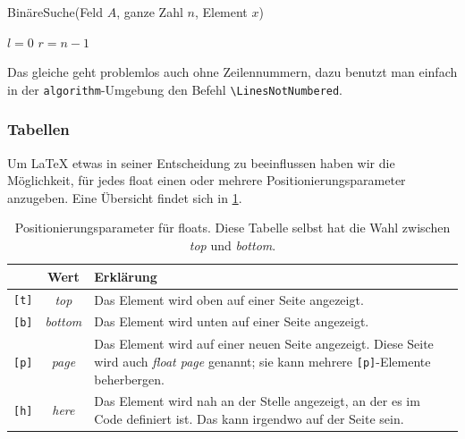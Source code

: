 \documentclass[bachelor,german]{algothesis}
\begin{document}
\begin{algorithm}[t]
  \caption{BinäreSuche(Feld $A$, ganze Zahl $n$, Element $x$)}
  \label{alg:binsearch}
  
  $l = 0$ \;
  $r = n-1$ \;
  
  \Return \False
\end{algorithm}

Das gleiche geht problemlos auch ohne Zeilennummern, dazu benutzt man einfach in der \verb+algorithm+-Umgebung den Befehl \verb+\LinesNotNumbered+.

\subsubsection{Tabellen}

Um \LaTeX{} etwas in seiner Entscheidung zu beeinflussen haben wir die Möglichkeit, für jedes float einen oder mehrere Positionierungsparameter anzugeben.
Eine Übersicht findet sich in \cref{tab:floatparameters}.

\begin{table}[tb]
 \caption{Positionierungsparameter für floats. Diese Tabelle selbst hat die Wahl zwischen \emph{top} und \emph{bottom}.}
 \label{tab:floatparameters}
 \centering
 \begin{tabularx}{0.9\textwidth}{p{1cm}cX}
  & Wert & Erklärung\\
 \hline
  \texttt{[t]}  & \emph{top} & Das Element wird oben auf einer Seite angezeigt. \\
  \texttt{[b]}  & \emph{bottom} & Das Element wird unten auf einer Seite angezeigt. \\
  \texttt{[p]}  & \emph{page} & Das Element wird auf einer neuen Seite angezeigt. Diese Seite wird auch \emph{float page} genannt; sie kann mehrere \texttt{[p]}-Elemente beherbergen. \\
  \texttt{[h]}  & \emph{here} & Das Element wird nah an der Stelle angezeigt, an der es im Code definiert ist. Das kann irgendwo auf der Seite sein. \\
 \end{tabularx}
\end{table}
\end{document}
